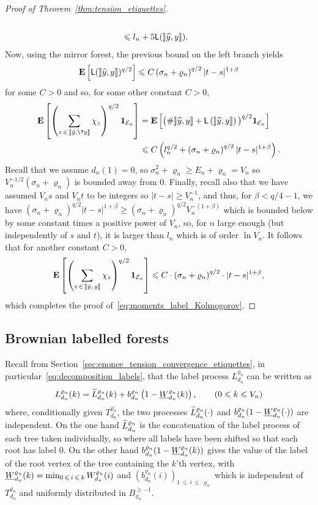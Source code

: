 \documentclass[AHL,Unicode,longabstracts,published]{cedram}
\newcommand{\rrbracket}{\mathclose{]\mkern -2.7mu]}}
\newcommand{\ensembles}[1]{\mathbf{#1}}
\newcommand{\E}{\ensembles{E}}
\newcommand{\Es}[1]{\E\left[#1\right]}
\newcommand{\1}{\ensembles{1}}
\newcommand{\tildep}[1]{\widetilde{#1}\vphantom{#1}}
\newcommand{\underlinep}[1]{\underline{#1}\vphantom{#1}}
\renewcommand{\le}{\leqslant}
\renewcommand{\ge}{\geqslant}
\newcommand{\LL}{\mathsf{L}}
\newcommand{\BBmap}{B}
\newcommand{\clE}{\mathcal{E}}
\newcommand{\fn}{T_{d_n}^{\varrho_n}}
\newcommand{\Wfn}{W_{d_n}^{\varrho_n}}
\newcommand{\Lfn}{L_{d_n}^{\varrho_n}}
\newcommand{\tLfn}{\tildep{L}_{d_n}^{\varrho_n}}
\newcommand{\bfn}{b_{d_n}^{\varrho_n}}
\newcommand{\infWfn}{\underlinep{W}_{d_n}^{\varrho_n}}
\newcommand{\edges}{E}
\newcommand{\vertices}{V}
\let\oldhat\hat
\renewcommand*{\hat}[1]{\mathchoice{\widehat{#1}}{\widehat{#1}}{\oldhat{#1}}{\oldhat{#1}}}
\begin{document}
\begin{proof}[Proof of Theorem~\ref{thm:tension_etiquettes}]
\begin{align*}
\\
&\le l_n + 5 \LL(\mathopen{\rrbracket} \hat{y}, y \mathclose{\rrbracket}).
\end{align*}
Now, using the mirror forest, the previous bound on the left branch yields
\[
\E\left[\LL(\mathopen{\rrbracket} \hat{y}, y \mathclose{\rrbracket})^{q/2}\right] \le C \left(\sigma_n + \varrho_n\right)^{q/2} |t-s|^{1+\beta}
\]
for some $C>0$ and so, for some other constant $C > 0$,
\begin{align*}
\Es{\left(\sum_{z\,\in\,\mathopen{\rrbracket} \hat{y},\?y \mathclose{\rrbracket}} \chi_{z}\right)^{q/2} \1_{\clE_n}} &= \Es{\big(\# \mathopen{\rrbracket} \hat{y}, y \mathclose{\rrbracket} + \LL\left(\mathopen{\rrbracket} \hat{y}, y \mathclose{\rrbracket}\right)\big)^{q/2} \1_{\clE_n}}
\\
&\le C \left(l_n^{q/2} + \left(\sigma_n + \varrho_n\right)^{q/2} |t-s|^{1+\beta}\right).
\end{align*}
Recall that we assume $d_{n}(1) = 0$, so $\sigma_{n}^{2} + \varrho_{n} \ge \edges_{n}+ \varrho_{n} = \vertices_{n}$ so $\vertices_n^{-1/2} (\sigma_n + \varrho_n)$ is bounded away from $0$. Finally, recall also that we have assumed $\vertices_n s$ and $\vertices_n t$ to be integers so $|t-s| \ge \vertices_n^{-1}$, and thus, for $\beta < q/4-1$, we have $(\sigma_n + \varrho_n)^{q/2} |t - s|^{1+\beta} \ge (\sigma_n + \varrho_n)^{q/2} \vertices_n^{-(1+\beta)}$ which is bounded below by some constant times a positive power of $\vertices_n$, so, for $n$ large enough (but independently of $s$ and $t$), it is larger than $l_n$ which is of order $\ln \vertices_n$. It follows that for another constant $C > 0$,
\[
\Es{\left(\sum_{z\,\in\,\mathopen{\rrbracket} \hat{y},\,y \mathclose{\rrbracket}} \chi_{z}\right)^{q/2} \1_{\clE_n}}
\le C \cdot \left(\sigma_n + \varrho_n\right)^{q/2} \cdot |t - s|^{1+\beta},
\]
which completes the proof of~\eqref{eq:moments_label_Kolmogorov}.
\end{proof}



\subsection{Brownian labelled forests}\label{sec:serpent_brownien}

Recall from Section~\ref{sec:enonce_tension_convergence_etiquettes}, in particular~\eqref{eq:decomposition_labels}, that the label process $\Lfn$ can be written as
\[
\Lfn(k) = \tLfn(k) + \bfn\left(1-\infWfn(k)\right),
\qquad (0\le k \le V_n)
\]
where, conditionally given $\fn$, the two processes $\tLfn(\cdot)$ and $\bfn(1-\infWfn(\cdot))$ are independent. On the one hand $\tLfn$ is the concatenation of the label process of each tree taken individually, so where all labels have been shifted so that each root has label $0$. On the other hand $\bfn(1-\infWfn(k))$ gives the value of the label of the root vertex of the tree containing the $k$'th vertex, with $\infWfn(k) = \min_{0\,\le\,i\,\le\,k} \Wfn(i)$ and $(\bfn(i))_{1\,\le\,i\,\le\,\varrho_n}$ which is independent of $\fn$ and uniformly distributed in $\BBmap_{\varrho_n}^{\ge -1}$.
\end{document}
